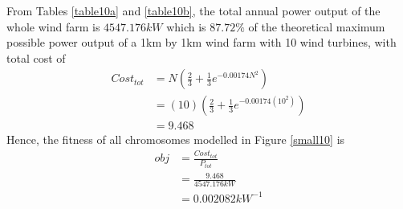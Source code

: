         From Tables \ref{table10a} and \ref{table10b}, the total annual power output of the whole wind farm is $4547.176kW$ which is $87.72\%$ of the theoretical maximum possible power output of a 1km by 1km wind farm with 10 wind turbines, with total cost of
        \begin{align*}
            Cost_{tot}
            &= N\left(\frac{2}{3} + \frac{1}{3}e^{-0.00174N^2}\right) \\
            &= \left(10\right)\left(\frac{2}{3} + \frac{1}{3}e^{-0.00174\left(10^2\right)}\right) \\
            &= 9.468
        \end{align*}
        Hence, the fitness of all chromosomes modelled in Figure \ref{small10} is
        \begin{align*}
            obj
            &=\frac{Cost_{tot}}{P_{tot}} \\
            &=\frac{9.468}{4547.176kW} \\
            &=0.002082kW^{-1}
        \end{align*} 
        
